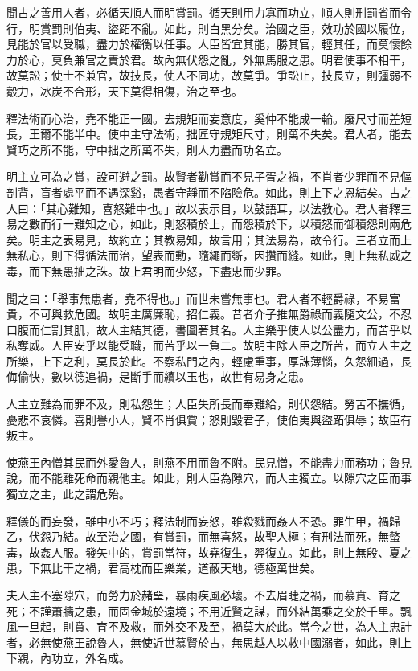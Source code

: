 
\begin{pinyinscope}
聞古之善用人者，必循天順人而明賞罰。循天則用力寡而功立，順人則刑罰省而令行，明賞罰則伯夷、盜跖不亂。如此，則白黑分矣。治國之臣，效功於國以履位，見能於官以受職，盡力於權衡以任事。人臣皆宜其能，勝其官，輕其任，而莫懷餘力於心，莫負兼官之責於君。故內無伏怨之亂，外無馬服之患。明君使事不相干，故莫訟；使士不兼官，故技長，使人不同功，故莫爭。爭訟止，技長立，則彊弱不觳力，冰炭不合形，天下莫得相傷，治之至也。

釋法術而心治，堯不能正一國。去規矩而妄意度，奚仲不能成一輪。廢尺寸而差短長，王爾不能半中。使中主守法術，拙匠守規矩尺寸，則萬不失矣。君人者，能去賢巧之所不能，守中拙之所萬不失，則人力盡而功名立。

明主立可為之賞，設可避之罰。故賢者勸賞而不見子胥之禍，不肖者少罪而不見傴剖背，盲者處平而不遇深谿，愚者守靜而不陷險危。如此，則上下之恩結矣。古之人曰：「其心難知，喜怒難中也。」故以表示目，以鼓語耳，以法教心。君人者釋三易之數而行一難知之心，如此，則怒積於上，而怨積於下，以積怒而御積怨則兩危矣。明主之表易見，故約立；其教易知，故言用；其法易為，故令行。三者立而上無私心，則下得循法而治，望表而動，隨繩而斲，因攢而縫。如此，則上無私威之毒，而下無愚拙之誅。故上君明而少怒，下盡忠而少罪。

聞之曰：「舉事無患者，堯不得也。」而世未嘗無事也。君人者不輕爵祿，不易富貴，不可與救危國。故明主厲廉恥，招仁義。昔者介子推無爵祿而義隨文公，不忍口腹而仁割其肌，故人主結其德，書圖著其名。人主樂乎使人以公盡力，而苦乎以私奪威。人臣安乎以能受職，而苦乎以一負二。故明主除人臣之所苦，而立人主之所樂，上下之利，莫長於此。不察私門之內，輕慮重事，厚誅薄惱，久怨細過，長侮偷快，數以德追禍，是斷手而續以玉也，故世有易身之患。

人主立難為而罪不及，則私怨生；人臣失所長而奉難給，則伏怨結。勞苦不撫循，憂悲不哀憐。喜則譽小人，賢不肖俱賞；怒則毀君子，使伯夷與盜跖俱辱；故臣有叛主。

使燕王內憎其民而外愛魯人，則燕不用而魯不附。民見憎，不能盡力而務功；魯見說，而不能離死命而親他主。如此，則人臣為隙穴，而人主獨立。以隙穴之臣而事獨立之主，此之謂危殆。

釋儀的而妄發，雖中小不巧；釋法制而妄怒，雖殺戮而姦人不恐。罪生甲，禍歸乙，伏怨乃結。故至治之國，有賞罰，而無喜怒，故聖人極；有刑法而死，無螫毒，故姦人服。發矢中的，賞罰當符，故堯復生，羿復立。如此，則上無殷、夏之患，下無比干之禍，君高枕而臣樂業，道蔽天地，德極萬世矣。

夫人主不塞隙穴，而勞力於赭堊，暴雨疾風必壞。不去眉睫之禍，而慕賁、育之死；不謹蕭牆之患，而固金城於遠境；不用近賢之謀，而外結萬乘之交於千里。飄風一旦起，則賁、育不及救，而外交不及至，禍莫大於此。當今之世，為人主忠計者，必無使燕王說魯人，無使近世慕賢於古，無思越人以救中國溺者，如此，則上下親，內功立，外名成。


\end{pinyinscope}